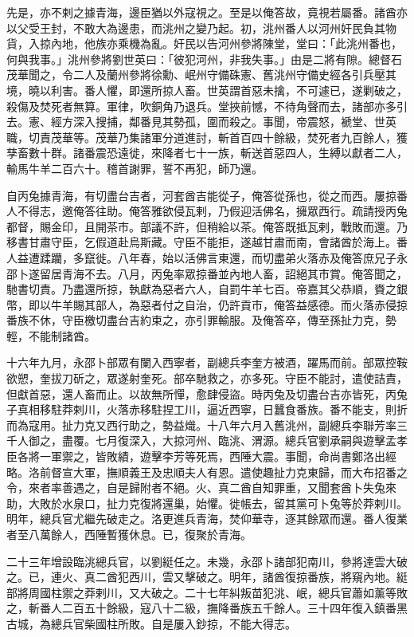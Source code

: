 \begin{pinyinscope}
先是，亦不剌之據青海，邊臣猶以外寇視之。至是以俺答故，竟視若屬番。諸酋亦以父受王封，不敢大為邊患，而洮州之變乃起。初，洮州番人以河州奸民負其物貨，入掠內地，他族亦乘機為亂。奸民以告河州參將陳堂，堂曰：「此洮州番也，何與我事。」洮州參將劉世英曰：「彼犯河州，非我失事。」由是二將有隙。總督石茂華聞之，令二人及蘭州參將徐勳、岷州守備硃憲、舊洮州守備史經各引兵壓其境，曉以利害。番人懼，即還所掠人畜。世英謂首惡未擒，不可遽已，遂剿破之，殺傷及焚死者無算。軍律，吹銅角乃退兵。堂挾前憾，不待角聲而去，諸部亦多引去。憲、經方深入搜捕，鄰番見其勢孤，圍而殺之。事聞，帝震怒，褫堂、世英職，切責茂華等。茂華乃集諸軍分道進討，斬首百四十餘級，焚死者九百餘人，獲孳畜數十群。諸番震恐遠徙，來降者七十一族，斬送首惡四人，生縛以獻者二人，輸馬牛羊二百六十。稽首謝罪，誓不再犯，師乃還。

自丙兔據青海，有切盡台吉者，河套酋吉能從子，俺答從孫也，從之而西。屢掠番人不得志，邀俺答往助。俺答雅欲侵瓦剌，乃假迎活佛名，擁眾西行。疏請授丙兔都督，賜金印，且開茶市。部議不許，但稍給以茶。俺答既抵瓦剌，戰敗而還。乃移書甘肅守臣，乞假道赴烏斯藏。守臣不能拒，遂越甘肅而南，會諸酋於海上。番人益遭蹂躪，多竄徙。八年春，始以活佛言東還，而切盡弟火落赤及俺答庶兄子永邵卜遂留居青海不去。八月，丙兔率眾掠番並內地人畜，詔絕其市賞。俺答聞之，馳書切責。乃盡還所掠，執獻為惡者六人，自罰牛羊七百。帝嘉其父恭順，賚之銀幣，即以牛羊賜其部人，為惡者付之自治，仍許貢市，俺答益感德。而火落赤侵掠番族不休，守臣檄切盡台吉約束之，亦引罪輸服。及俺答卒，傳至孫扯力克，勢輕，不能制諸酋。

十六年九月，永邵卜部眾有闌入西寧者，副總兵李奎方被酒，躍馬而前。部眾控鞍欲愬，奎拔刀斫之，眾遂射奎死。部卒馳救之，亦多死。守臣不能討，遣使詰責，但獻首惡，還人畜而止。以故無所憚，愈肆侵盜。時丙兔及切盡台吉亦皆死，丙兔子真相移駐莽剌川，火落赤移駐捏工川，逼近西寧，日蠶食番族。番不能支，則折而為寇用。扯力克又西行助之，勢益熾。十八年六月入舊洮州，副總兵李聯芳率三千人御之，盡覆。七月復深入，大掠河州、臨洮、渭源。總兵官劉承嗣與遊擊孟孝臣各將一軍禦之，皆敗績，遊擊李芳等死焉，西陲大震。事聞，命尚書鄭洛出經略。洛前督宣大軍，撫順義王及忠順夫人有恩。遣使趣扯力克東歸，而大布招番之令，來者率善遇之，自是歸附者不絕。火、真二酋自知罪重，又聞套酋卜失兔來助，大敗於水泉口，扯力克復將還巢，始懼。徙帳去，留其黨可卜兔等於莽剌川。明年，總兵官尤繼先破走之。洛更進兵青海，焚仰華寺，逐其餘眾而還。番人復業者至八萬餘人，西陲暫獲休息。已，復聚於青海。

二十三年增設臨洮總兵官，以劉綎任之。未幾，永邵卜諸部犯南川，參將達雲大破之。已，連火、真二酋犯西川，雲又擊破之。明年，諸酋復掠番族，將窺內地。綎部將周國柱禦之莽剌川，又大破之。二十七年糾叛苗犯洮、岷，總兵官蕭如薰等敗之，斬番人二百五十餘級，寇八十二級，撫降番族五千餘人。三十四年復入鎮番黑古城，為總兵官柴國柱所敗。自是屢入鈔掠，不能大得志。


\end{pinyinscope}
